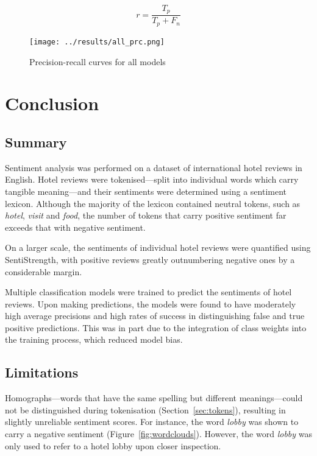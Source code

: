\documentclass[11pt, a4paper]{pancake-article}
\begin{document}
\begin{equation}
  r = \frac{T_p}{T_p + F_n}
  \label{eq:recall}
\end{equation}

\begin{figure}
  \begin{center}
    \texttt{[image: ../results/all\_prc.png]}
  \end{center}
  \caption{Precision-recall curves for all models}\label{fig:prc-all}
\end{figure}

\section{Conclusion}

\subsection{Summary}

Sentiment analysis was performed on a dataset of international hotel reviews
in English. Hotel reviews were tokenised---split into individual words which
carry tangible meaning---and their sentiments were determined using a sentiment
lexicon. Although the majority of the lexicon contained neutral tokens,
such as \textit{hotel}, \textit{visit} and \textit{food}, the number of tokens
that carry positive sentiment far exceeds that with negative sentiment.

On a larger scale, the sentiments of individual hotel reviews were quantified
using SentiStrength, with positive reviews greatly outnumbering negative ones
by a considerable margin.

Multiple classification models were trained to
predict the sentiments of hotel reviews. Upon making predictions, the models
were found to have moderately high average precisions and high rates of
success in distinguishing false and true positive predictions. This was
in part due to the integration of class weights into the training process,
which reduced model bias.

\subsection{Limitations}

Homographs---words that have the same spelling but different meanings---could
not be distinguished during tokenisation (Section~\ref{sec:tokens}),
resulting in
slightly unreliable sentiment scores. For instance, the word
\textit{lobby} was shown to
carry a negative sentiment (Figure~\ref{fig:wordclouds}). However,
the word \textit{lobby}
was only used to refer to a hotel lobby upon closer inspection.
\end{document}
